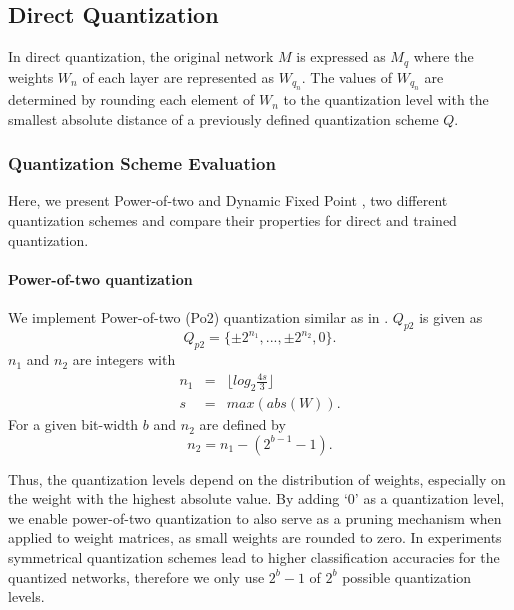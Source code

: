 \subsection{Direct Quantization}
\label{subsec:quant}
In direct quantization, the original network $M$ is expressed as $M_q$ where 
the weights $W_n$ of each layer are represented as $W_{q_n}$. The values of 
$W_{q_n}$ are determined by rounding each element of $W_n$ to the quantization 
level with the smallest absolute distance of a previously defined quantization 
scheme $Q$.

\subsubsection{Quantization Scheme Evaluation}
Here, we present Power-of-two \cite{Zhou2017a} and Dynamic Fixed Point 
\cite{Hubara2016, Gysel2016a}, two different quantization schemes and 
compare their properties for direct and trained quantization.

\paragraph{Power-of-two quantization}
We implement Power-of-two (Po2) quantization similar as in \cite{Zhou2017a}. $Q_{p2}$ is given as
\begin{equation}\label{eq:pow2_quant}
Q_{p2} = \{\pm 2^{n_1},... ,\pm 2^{n_2},0\}.
\end{equation}
$n_1$ and $n_2$ are integers with
\begin{eqnarray}
n_1 &=& \lfloor log_2 \frac{4s}{3} \rfloor \label{eq:n1_max}\\
s &=&  max(abs(W)). \label{eq:s_max}
\end{eqnarray}
For a given bit-width $b$ and $n_2$ are defined by
\begin{equation}\label{eq:n2}
n_2 =  n_1 - (2^{b-1} -1).
\end{equation}

Thus, the quantization levels depend on the distribution of weights, 
especially on the weight with the highest absolute value. By adding `$0$' as 
a quantization level, we enable power-of-two quantization to also serve as a 
pruning mechanism when applied to weight matrices, as small weights are rounded 
to zero. In experiments symmetrical quantization schemes lead to higher 
classification accuracies for the quantized networks, 
therefore we only use $2^b-1$ of $2^b$ possible quantization levels.

